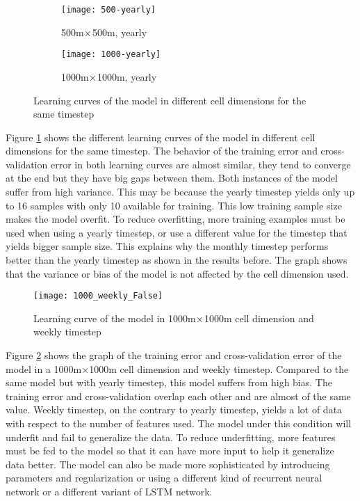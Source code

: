     \begin{figure}[H]
    \centering
    \begin{subfigure}{.5\textwidth}
      \centering
      \texttt{[image: 500-yearly]}
      \caption{500m$\protect\times$500m, yearly}
    \end{subfigure}%
    \begin{subfigure}{.5\textwidth}
      \centering
      \texttt{[image: 1000-yearly]}
      \caption{1000m$\protect\times$1000m, yearly}
    \end{subfigure}
    \caption{Learning curves of the model in different cell dimensions for the same timestep}
    \label{fig:dimension-learning-curve}
    \end{figure}

    Figure \ref{fig:dimension-learning-curve} shows the different learning curves of the model in different cell dimensions for the same timestep. The behavior of the training error and cross-validation error in both learning curves are almost similar, they tend to converge at the end but they have big gaps between them. Both instances of the model suffer from high variance. This may be because the yearly timestep yields only up to 16 samples with only 10 available for training. This low training sample size makes the model overfit. To reduce overfitting, more training examples must be used when using a yearly timestep, or use a different value for the timestep that yields bigger sample size. This explains why the monthly timestep performs better than the yearly timestep as shown in the results before. The graph shows that the variance or bias of the model is not affected by the cell dimension used.

    \begin{figure}[H]
      \centering
      \texttt{[image: 1000\_weekly\_False]}
      \caption{Learning curve of the model in 1000m$\protect\times$1000m cell dimension and weekly timestep}
      \label{fig:learning-curve2}
    \end{figure}
    Figure \ref{fig:learning-curve2} shows the graph of the training error and cross-validation error of the model in a 1000m\(\times\)1000m cell dimension and weekly timestep. Compared to the same model but with yearly timestep, this model suffers from high bias. The training error and cross-validation overlap each other and are almost of the same value. Weekly timestep, on the contrary to yearly timestep, yields a lot of data with respect to the number of features used. The model under this condition will underfit and fail to generalize the data. To reduce underfitting, more features must be fed to the model so that it can have more input to help it generalize data better. The model can also be made more sophisticated by introducing parameters and regularization or using a different kind of recurrent neural network or a different variant of LSTM network.

